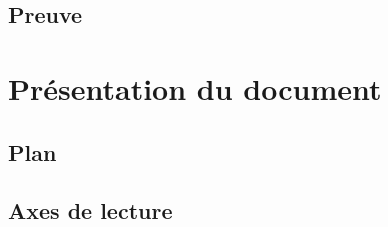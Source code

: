 \subsection{Preuve}

\section{Présentation du document}

\subsection{Plan}

\subsection{Axes de lecture}

